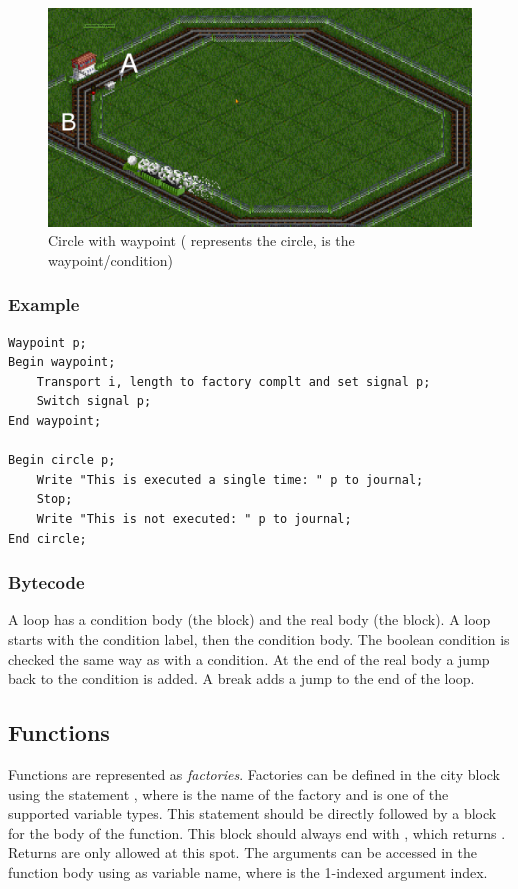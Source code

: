 \begin{figure}[t]
\centering
\includegraphics[scale=0.25]{Images/circle}
\caption{Circle with waypoint ( represents the circle,  is the waypoint/condition)}
\label{fig:circle}
\end{figure}

\subsubsection*{Example}

\begin{lstlisting}
Waypoint p;
Begin waypoint;
	Transport i, length to factory complt and set signal p;
	Switch signal p;
End waypoint;

Begin circle p;
	Write "This is executed a single time: " p to journal;
	Stop;
	Write "This is not executed: " p to journal;
End circle;
\end{lstlisting}

\subsubsection*{Bytecode}

A loop has a condition body (the  block) and the real body (the  block). A loop starts with the condition label, then the condition body. The boolean condition is checked the same way as with a condition. At the end of the real body a jump back to the condition is added. A break adds a jump to the end of the loop.

\subsection{Functions}

Functions are represented as \emph{factories}. Factories can be defined in the  city block using the statement , where  is the name of the factory and  is one of the supported variable types. This statement should be directly followed by a  block for the body of the function. This block should always end with , which returns . Returns are only allowed at this spot. The arguments can be accessed in the function body using  as variable name, where  is the 1-indexed argument index.

